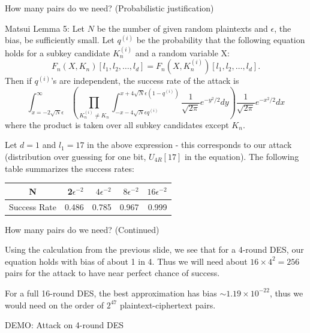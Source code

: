 \documentclass[9pt]{beamer}
\begin{document}
\begin{frame}
How many pairs do we need? (Probabilistic justification)

\vspace{3mm}
\pause Matsui Lemma 5: Let $N$ be the number of given random plaintexts and $\epsilon$, the bias, be sufficiently small. Let $q^{(i)}$ be the probability that the following equation holds for a subkey candidate $K_n^{(i)}$ and a random variable X:
\[ F_n(X,K_n)[l_1, l_2,\dots,l_d] = F_n(X, K_n^{(i)})[l_1, l_2, \dots, l_d].\]
\pause Then if $q^{(i)}$'s are independent, the success rate of the attack is
\[ \int_{x=-2\sqrt{N}\epsilon}^\infty \left( \prod_{K_n^{(i)} \neq K_n} \int_{-x-4\sqrt{N}\epsilon q^{(i)}}^{x+4\sqrt{N}\epsilon (1 - q^{(i)})} \frac{1}{\sqrt{2\pi}} e^{-y^2/2} dy \right) \frac{1}{\sqrt{2\pi}} e^{-x^2/2} dx \]
where the product is taken over all subkey candidates except $K_n$.

\vspace{3mm}
\pause Let $d = 1$ and $l_1 = 17$ in the above expression - this corresponds to our attack (distribution over guessing for one bit, $U_{4R}[17]$ in the equation). The following table summarizes the success rates:
\begin{center}
\begin{tabular}{|c|r|r|r|r|}
\hline
N & 2$\epsilon^{-2}$ & $4\epsilon^{-2}$ & $8\epsilon^{-2}$ & $16\epsilon^{-2}$ \\
\hline
Success Rate & 0.486 & 0.785 & 0.967 & 0.999 \\
\hline
\end{tabular} 
\end{center}
\end{frame}

\begin{frame}
How many pairs do we need? (Continued)

\vspace{3mm}
Using the calculation from the previous slide, we see that for a 4-round DES, our equation holds with bias of about 1 in 4. \pause Thus we will need about $16\times 4^2 = 256$ pairs for the attack to have near perfect chance of success.

\vspace{3mm}
\pause For a full 16-round DES, the best approximation has bias $\sim 1.19\times 10^{-22}$, thus we would need on the order of $2^{47}$ plaintext-ciphertext pairs.
\end{frame}

\begin{frame}
DEMO: Attack on 4-round DES
\end{frame}
\end{document}
